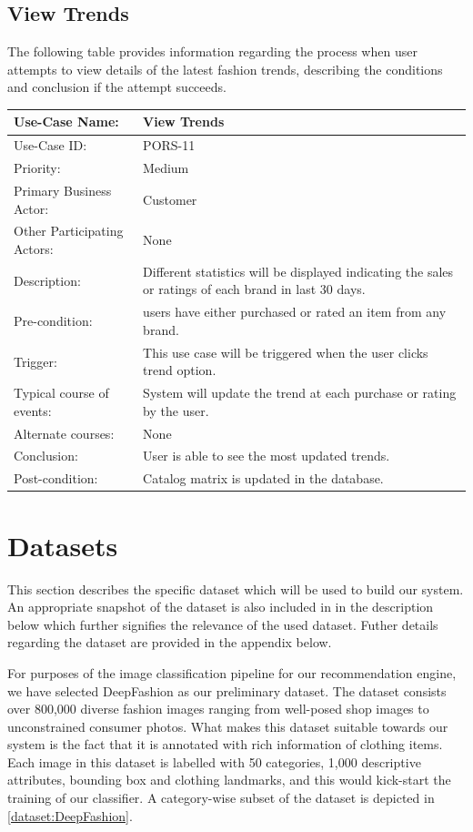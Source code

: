 \subsection{View Trends}
The following table provides information regarding the process when user attempts to view details of the latest fashion trends, describing the conditions and conclusion if the attempt succeeds. 
\begin{center}
    \begin{tabular}{ @{}|p{5cm}||p{7cm}|  }
    \hline
    Use-Case Name: & View Trends \\ \hline
    Use-Case ID: & PORS-11 \\ \hline
    Priority: & Medium \\ \hline
    Primary Business Actor: & Customer \\ \hline
    Other Participating Actors: & None \\ \hline
    Description: & Different statistics will be displayed indicating the sales or ratings of each brand in last 30 days.  \\ \hline
    Pre-condition: &  users have either purchased or rated an item from any brand.\\ \hline
    Trigger: &  This use case will be triggered when the user clicks trend option. \\ \hline
    Typical course of events: & System will update the trend at each purchase or rating by the user. \\ \hline
    Alternate courses: & None\\ \hline
    Conclusion: &  User is able to see the most updated trends. \\ \hline
    Post-condition: &  Catalog matrix is updated in the database.\\ \hline
    \end{tabular}
\end{center}

\section{Datasets}
This section describes the specific dataset which will be used to build our system. An appropriate snapshot of the dataset is also included in in the description below which further signifies the relevance of the used dataset. Futher details regarding the dataset are provided in the appendix below.

For purposes of the image classification pipeline for our recommendation engine, we have selected DeepFashion \cite{DeepFashion} as our preliminary dataset. The dataset consists over 800,000 diverse fashion images ranging from well-posed shop images to unconstrained consumer photos. What makes this dataset suitable towards our system is the fact that it is annotated with rich information of clothing items. Each image in this dataset is labelled with 50 categories, 1,000 descriptive attributes, bounding box and clothing landmarks, and this would kick-start the training of our classifier. A category-wise subset of the dataset is depicted in \autoref{dataset:DeepFashion}. 

